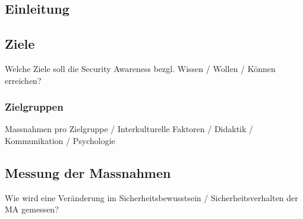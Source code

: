 \documentclass[../../main.tex]{subfiles}
\begin{document}
\subsection{Einleitung}

\subsection{Ziele}
  Welche Ziele soll die Security Awareness bezgl. Wissen / Wollen / Können erreichen? 
\subsubsection{Zielgruppen}
    Massnahmen pro Zielgruppe / Interkulturelle Faktoren / Didaktik / Kommunikation / Psychologie
\subsection{Messung der Massnahmen}
  Wie wird eine Veränderung im Sicherheitsbewusstsein / Sicherheitsverhalten der MA gemessen?
\end{document}
